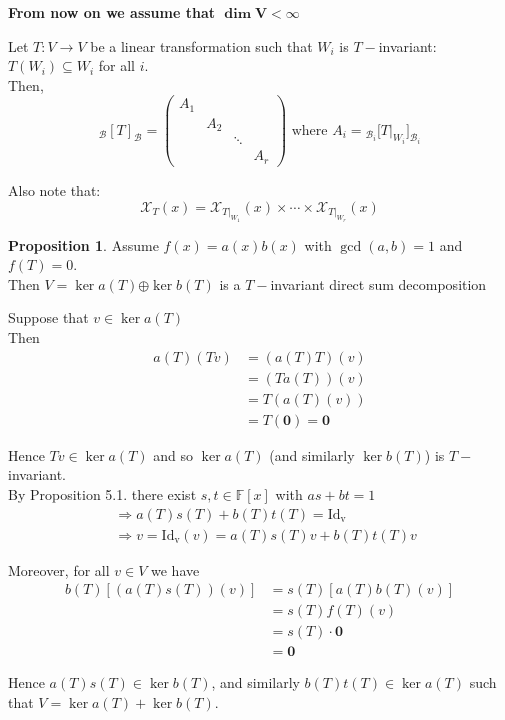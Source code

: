 \documentclass[11pt, a4paper]{report}
\makeatletter
\numberwithin{equation}{section}
\renewcommand{\chi}{\mathcal{X}}
\newcommand{\opl}{\boldsymbol{\oplus}}
\newcommand{\F}{\mathbb{F}}
\newcommand{\pmx}[1]{\begin{pmatrix}#1\end{pmatrix}}
\numberwithin{equation}{subsection}
\theoremstyle{plain}
\theoremstyle{definition}
\newtheorem{prop}[thm]{Proposition}
\theoremstyle{remark}
\newtheorem*{prf}{Proof}
\renewenvironment{prf}[1][\proofname]{\par
  \vspace{-\topsep}%
  \normalfont
  \topsep0pt \partopsep0pt %
  \trivlist
  \item[\hskip\labelsep
        \itshape
    #1\@addpunct{.}]\ignorespaces
}{%
  \popQED\endtrivlist\@endpefalse
  \addvspace{6pt plus 6pt} %
}
\newcommand{\pr}[1]{\begin{adjustwidth}{1cm}{} \begin{prf} #1 \end{prf} \end{adjustwidth}}
\makeatother
\begin{document}
\textbf{From now on we assume that $\boldsymbol{\dim V < \infty}$}

Let $T: V \to V$ be a linear transformation such that $W_i$ is $T-$invariant: $T(W_i) \subseteq W_i$ for all $i$.\\
Then,
\[
_\mathcal{B}[T]_\mathcal{B} = \pmx{A_1 \\ & A_2 \\ & & \ddots \\ & & & A_r }
\text{ where } A_i = {_{\mathcal{B}_i}[}T|_{W_i}]_{\mathcal{B}_i}
\]

Also note that:
$$ \chi_T (x) = \chi_{T|_{W_1}}(x) \times \cdots \times \chi_{T|_{W_r}}(x) $$

\begin{prop} Assume $f(x) = a(x)b(x)$ with $\gcd(a,b) = 1$ and $f(T) = 0$.\\ Then $V = \ker a(T) \opl \ker b(T)$ is a $T-$invariant direct sum decomposition 

\pr{
Suppose that $v \in \ker a(T)$\\
Then
\begin{align*}
a(T)(Tv) 	&= (a(T)T)(v)\\ 	
			&= (Ta(T))(v)\\
			&= T(a(T)(v))\\
			&= T(\boldsymbol{0}) = \boldsymbol{0}
\end{align*}

Hence $Tv \in \ker a(T)$ and so $\ker a(T)$ (and similarly $\ker b(T)$) is $T-$invariant.\\
By Proposition 5.1. there exist $s,t \in \F[x]$ with $as + bt = 1$
\begin{align*}
&\Rightarrow a(T)s(T) + b(T)t(T) = \mathrm{Id_v}\\
&\Rightarrow v = \mathrm{Id_v}(v) = a(T)s(T)v + b(T)t(T)v \tag{$*$}
\end{align*}\vspace*{-32pt}

Moreover, for all $v \in V$ we have
\begin{align*}
b(T)[(a(T)s(T))(v)] &= s(T)[a(T)b(T)(v)]\\
					&= s(T)f(T)(v) \tag{$ab = f$}\\
					&= s(T) \cdot \boldsymbol{0} \tag{$f(T) = 0$}\\
					&= \boldsymbol{0}
\end{align*}

Hence $a(T)s(T) \in \ker b(T)$, and similarly $b(T)t(T) \in \ker a(T)$ such that $V = \ker a(T) + \ker b(T)$.

}
\end{prop}
\end{document}
